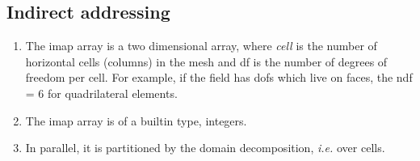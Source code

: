 \documentclass{report}
\begin{document}
\subsection{Indirect addressing}
  \begin{enumerate}  
     \item The imap array is a two dimensional array, where {\em cell} is the
       number of horizontal cells (columns) in the mesh and df is the
       number of degrees of freedom per cell. For example, if the
       field has dofs which live on faces, the ndf = 6 for
       quadrilateral elements.
     \item The imap array is of a builtin type, integers.
     \item In parallel, it is partitioned by the domain
       decomposition, {\em i.e.} over cells.
  \end{enumerate}
\end{document}
